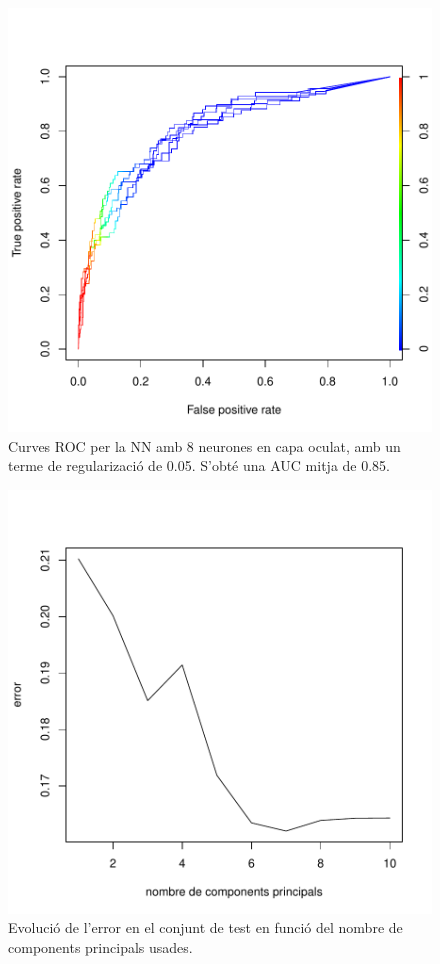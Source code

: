 \documentclass[a4paper,10pt]{article}
\begin{document}
\begin{center}
\begin{figure}
\includegraphics[width=5in]{memoria-nn_roc}
\caption{Curves ROC per la NN amb 8 neurones en capa oculat, amb un terme de regularizació de 0.05. S'obté una AUC mitja de 0.85.} \label{fig:nn_roc}
\end{figure}
\end{center}

\begin{center}
\begin{figure}
\includegraphics[width=5in]{memoria-nn_princomp}
\caption{Evolució de l'error en el conjunt de test en funció del nombre de components principals usades.} \label{fig:nn_roc}
\end{figure}
\end{center}
\end{document}
